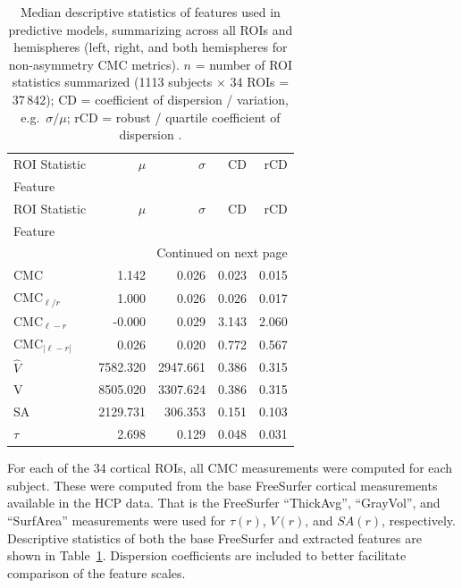 \documentclass{article}
\begin{document}
\begin{longtable}{lrrrr}
	\caption{Median descriptive statistics of features used in predictive models, summarizing across all ROIs and hemispheres (left, right, and both hemispheres for non-asymmetry CMC metrics). \(n\) = number of ROI statistics summarized (1113 subjects \(\times\) 34 ROIs = 37\,842); CD = coefficient of dispersion / variation, e.g.\ \(\sigma / \mu\); rCD = robust / quartile coefficient of dispersion \citep{bonettConfidenceIntervalCoefficient2006}.} \label{tab:pred-feature-stats} \\
	\toprule
	ROI Statistic & $\mu$ & $\sigma$ & CD & rCD \\
	Feature &  &  &  &  \\
	\midrule
	\endfirsthead
	\toprule
	ROI Statistic & $\mu$ & $\sigma$ & CD & rCD \\
	Feature &  &  &  &  \\
	\midrule
	\endhead
	\midrule
	\multicolumn{5}{r}{Continued on next page} \\
	\midrule
	\endfoot
	\bottomrule
	\endlastfoot
	$\text{CMC}$ & 1.142 & 0.026 & 0.023 & 0.015 \\
	$\text{CMC}_{\ell / r}$ & 1.000 & 0.026 & 0.026 & 0.017 \\
	$\text{CMC}_{\ell - r}$ & -0.000 & 0.029 & 3.143 & 2.060 \\
	$\text{CMC}_{|\ell - r|}$ & 0.026 & 0.020 & 0.772 & 0.567 \\
	$\hat{V}$ & 7582.320 & 2947.661 & 0.386 & 0.315 \\
	V & 8505.020 & 3307.624 & 0.386 & 0.315 \\
	SA & 2129.731 & 306.353 & 0.151 & 0.103 \\
	$\tau$ & 2.698 & 0.129 & 0.048 & 0.031 \\
	\end{longtable}

For each of the 34 cortical ROIs, all CMC measurements were computed for
each subject. These were computed from the base FreeSurfer cortical measurements
available in the HCP data. That is the FreeSurfer ``ThickAvg'', ``GrayVol'', and
``SurfArea'' measurements were used for \(\tau(r)\),  \(V(r)\), and \(SA(r)\),
respectively. Descriptive statistics of both the base FreeSurfer and extracted features
are shown in Table~\ref{tab:pred-feature-stats}. Dispersion coefficients are included to
better facilitate comparison of the feature scales.
\end{document}
